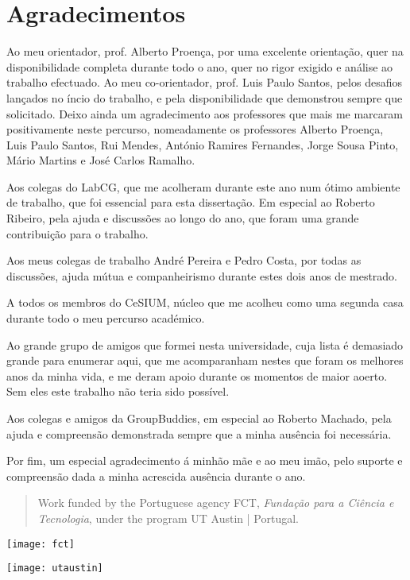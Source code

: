 \documentclass[main.tex]{subfiles}
\begin{document}
\chapter*{Agradecimentos}

Ao meu orientador, prof. Alberto Proença, por uma excelente orientação, quer na disponibilidade completa durante todo o ano, quer no rigor exigido e análise ao trabalho efectuado. Ao meu co-orientador, prof. Luis Paulo Santos, pelos desafios lançados no íncio do trabalho, e pela disponibilidade que demonstrou sempre que solicitado. Deixo ainda um agradecimento aos professores que mais me marcaram positivamente neste percurso, nomeadamente os professores Alberto Proença, Luis Paulo Santos, Rui Mendes, António Ramires Fernandes, Jorge Sousa Pinto, Mário Martins e José Carlos Ramalho.

Aos colegas do LabCG, que me acolheram durante este ano num ótimo ambiente de trabalho, que foi essencial para esta dissertação. Em especial ao Roberto Ribeiro, pela ajuda e discussões ao longo do ano, que foram uma grande contribuição para o trabalho.

Aos meus colegas de trabalho André Pereira e Pedro Costa, por todas as discussões, ajuda mútua e companheirismo durante estes dois anos de mestrado.

A todos os membros do CeSIUM, núcleo que me acolheu como uma segunda casa durante todo o meu percurso académico.

Ao grande grupo de amigos que formei nesta universidade, cuja lista é demasiado grande para enumerar aqui, que me acomparanham nestes que foram os melhores anos da minha vida, e me deram apoio durante os momentos de maior aoerto. Sem eles este trabalho não teria sido possível.

Aos colegas e amigos da GroupBuddies, em especial ao Roberto Machado, pela ajuda e compreensão demonstrada sempre que a minha ausência foi necessária.

Por fim, um especial agradecimento á minhão mãe e ao meu imão, pelo suporte e compreensão dada a minha acrescida ausência durante o ano.

\clearpage

\begin{quote}
  Work funded by the Portuguese agency FCT, \textit{Fundação para a Ciência e Tecnologia}, under the program UT Austin | Portugal.
\end{quote}

\begin{center}
  \texttt{[image: fct]}

  \texttt{[image: utaustin]}
\end{center}
\end{document}
